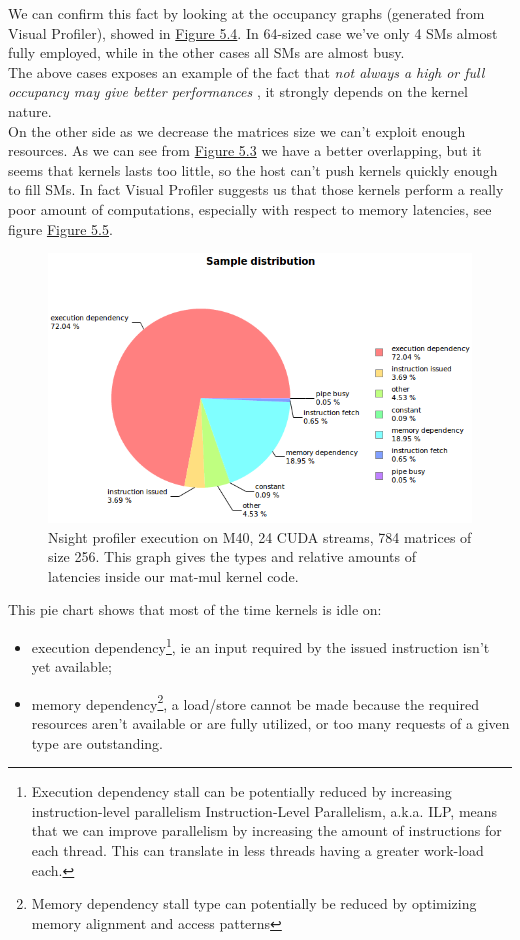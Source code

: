 We can confirm this fact by looking at the occupancy graphs (generated from Visual Profiler), showed in \hyperref[fig:SMuse]{Figure 5.4}. In 64-sized case we've only 4 SMs almost fully employed, while in the other cases all SMs are almost busy.\\
The above cases exposes an example of the fact that \textit{not always a high or full occupancy may give better performances} \cite{loweroccupancy,cudabestpractices}, it strongly depends on the kernel nature.\\
On the other side as we decrease the matrices size we can't exploit enough resources. As we can see from \hyperref[fig:timeln64]{Figure 5.3} we have a better overlapping, but it seems that kernels lasts too little, so the host can't push kernels quickly enough to fill SMs. In fact Visual Profiler suggests us that those kernels perform a really poor amount of computations, especially with respect to memory latencies, see figure \hyperref[fig:mat62latency]{Figure 5.5}.\\ 
\begin{figure}[!tb]
	\vspace{-1cm}
	\hspace{-1cm}
	\includegraphics[scale=0.8]{plots/matmul784_64_kerlatencies.png}
	\caption{Nsight profiler execution on M40, 24 CUDA streams, 784 matrices of size 256. This graph gives the types and relative amounts of latencies inside our mat-mul kernel code.}
	\label{fig:mat62latency}
\end{figure}
This pie chart shows that most of the time kernels is idle on:
\begin{itemize}
	\item execution dependency\footnote{Execution dependency stall can be potentially reduced by increasing instruction-level parallelism Instruction-Level Parallelism, a.k.a. ILP, means that we can improve parallelism by increasing the amount of instructions for each thread. This can translate in less threads having a greater work-load each. }, ie an input required by the issued instruction isn't yet available; 
	
	\item memory dependency\footnote{ Memory dependency stall type can potentially be reduced by optimizing memory alignment and access patterns}, a load/store cannot be made because the required resources aren't available or are fully utilized, or too many requests of a given type are outstanding.
\end{itemize}
